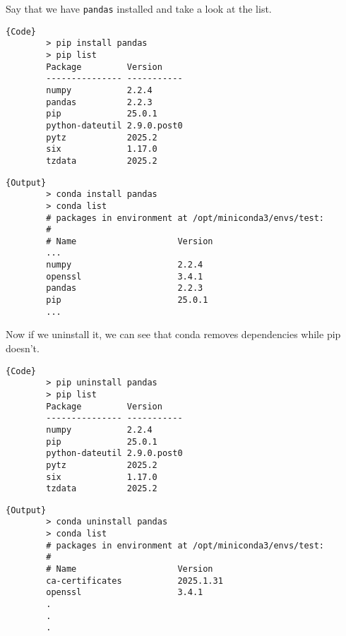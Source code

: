   \begin{example}
    Say that we have \texttt{pandas} installed and take a look at the list.
    
    \noindent\begin{minipage}{.35\textwidth}
      \begin{lstlisting}[]{Code}
        > pip install pandas 
        > pip list 
        Package         Version
        --------------- -----------
        numpy           2.2.4
        pandas          2.2.3
        pip             25.0.1
        python-dateutil 2.9.0.post0
        pytz            2025.2
        six             1.17.0
        tzdata          2025.2
      \end{lstlisting}
      \end{minipage}
      \hfill
      \begin{minipage}{.64\textwidth}
      \begin{lstlisting}[]{Output}
        > conda install pandas 
        > conda list
        # packages in environment at /opt/miniconda3/envs/test:
        #
        # Name                    Version       
        ...
        numpy                     2.2.4         
        openssl                   3.4.1         
        pandas                    2.2.3         
        pip                       25.0.1        
        ...
      \end{lstlisting}
    \end{minipage}

    Now if we uninstall it, we can see that conda removes dependencies while pip doesn't. 

    \noindent\begin{minipage}{.35\textwidth}
      \begin{lstlisting}[]{Code}
        > pip uninstall pandas 
        > pip list
        Package         Version
        --------------- -----------
        numpy           2.2.4
        pip             25.0.1
        python-dateutil 2.9.0.post0
        pytz            2025.2
        six             1.17.0
        tzdata          2025.2
      \end{lstlisting}
      \end{minipage}
      \hfill
      \begin{minipage}{.64\textwidth}
      \begin{lstlisting}[]{Output}
        > conda uninstall pandas 
        > conda list
        # packages in environment at /opt/miniconda3/envs/test:
        #
        # Name                    Version        
        ca-certificates           2025.1.31      
        openssl                   3.4.1          
        .
        .
        .
      \end{lstlisting}
    \end{minipage}
  \end{example} 

